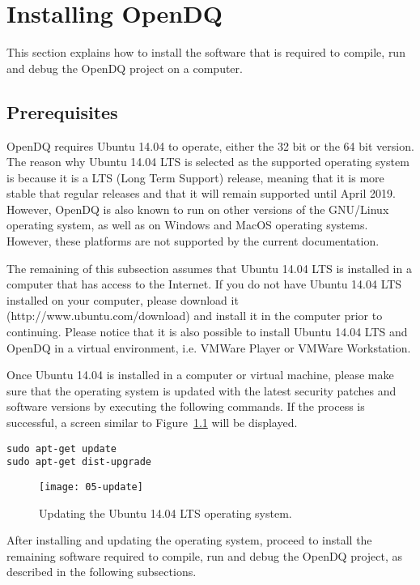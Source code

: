 \chapter{Installing OpenDQ}
\label{sec:03-installing}
This section explains how to install the software that is required to compile, run and debug the OpenDQ project on a computer. 

\section{Prerequisites}
OpenDQ requires Ubuntu 14.04 to operate, either the 32 bit or the 64 bit version. The reason why Ubuntu 14.04 LTS is selected as the supported operating system is because it is a LTS (Long Term Support) release, meaning that it is more stable that regular releases and that it will remain supported until April 2019. However, OpenDQ is also known to run on other versions of the GNU/Linux operating system, as well as on Windows and MacOS operating systems. However, these platforms are not supported by the current documentation.

The remaining of this subsection assumes that Ubuntu 14.04 LTS is installed in a computer that has access to the Internet. If you do not have Ubuntu 14.04 LTS installed on your computer, please download it (http://www.ubuntu.com/download) and install it in the computer prior to continuing. Please notice that it is also possible to install Ubuntu 14.04 LTS and OpenDQ in a virtual environment, i.e. VMWare Player or VMWare Workstation.

Once Ubuntu 14.04 is installed in a computer or virtual machine, please make sure that the operating system is updated with the latest security patches and software versions by executing the following commands. If the process is successful, a screen similar to Figure~\ref{fig:05-update} will be displayed.

\begin{verbatim}
sudo apt-get update
sudo apt-get dist-upgrade
\end{verbatim}

\begin{figure}[!ht]
    \centering
	\texttt{[image: 05-update]}
    \caption{Updating the Ubuntu 14.04 LTS operating system.}
    \label{fig:05-update}
\end{figure}

After installing and updating the operating system, proceed to install the remaining software required to compile, run and debug the OpenDQ project, as described in the following subsections.

